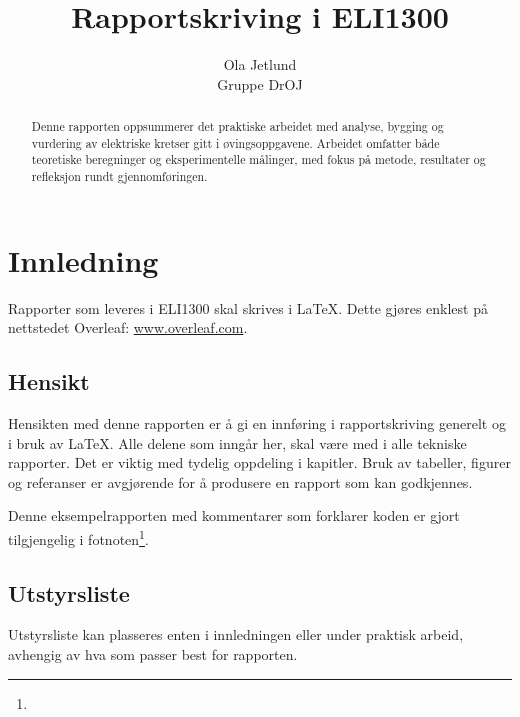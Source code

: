\documentclass[11pt,a4paper,twocolumn]{article}
\title{Rapportskriving i ELI1300}
\author{Ola Jetlund\\Gruppe DrOJ}
\date{} %
\begin{document}
\maketitle %

\begin{abstract}
    Denne rapporten oppsummerer det praktiske arbeidet med analyse, bygging og vurdering av elektriske kretser gitt i øvingsoppgavene. Arbeidet omfatter både teoretiske beregninger og eksperimentelle målinger, med fokus på metode, resultater og refleksjon rundt gjennomføringen.    
\end{abstract}


\section{Innledning}
Rapporter som leveres i ELI1300 skal skrives i \LaTeX. Dette gjøres enklest på nettstedet
Overleaf: \url{www.overleaf.com}.
\subsection{Hensikt}
Hensikten med denne rapporten er å gi en innføring i rapportskriving generelt og i bruk av \LaTeX. Alle delene som inngår her, skal være med i alle tekniske rapporter. Det er viktig med tydelig oppdeling i kapitler. Bruk av tabeller, figurer og referanser er avgjørende for å produsere en rapport som kan godkjennes.

Denne eksempelrapporten med kommentarer som forklarer koden er gjort tilgjengelig i fotnoten\footnote{\myoverleafurl}.


\subsection{Utstyrsliste}

Utstyrsliste kan plasseres enten i innledningen eller under praktisk arbeid, avhengig av hva som passer best for rapporten.
\end{document}
